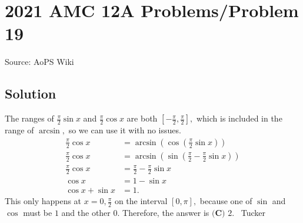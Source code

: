 \documentclass[12pt]{article}
\begin{document}
\section*{{2021 AMC 12A Problems/Problem 19}}
Source: AoPS Wiki

\subsection*{Solution}
The ranges of $\frac{\pi}2 \sin x$ and $\frac{\pi}2 \cos x$ are both $\left[-\frac{\pi}2, \frac{\pi}2 \right],$ which is included in the range of $\arcsin,$ so we can use it with no issues. \begin{align*} \frac{\pi}2 \cos x &= \arcsin \left( \cos \left( \frac{\pi}2 \sin x\right)\right) \\ \frac{\pi}2 \cos x &= \arcsin \left( \sin \left( \frac{\pi}2 - \frac{\pi}2 \sin x\right)\right) \\ \frac{\pi}2 \cos x &= \frac{\pi}2 - \frac{\pi}2 \sin x \\ \cos x &= 1 - \sin x \\ \cos x + \sin x &= 1. \end{align*} This only happens at $x = 0, \frac{\pi}2$ on the interval $[0,\pi],$ because one of $\sin$ and $\cos$ must be $1$ and the other $0.$ Therefore, the answer is $\boxed{\textbf{(C) }2}.$ ~Tucker
\end{document}
